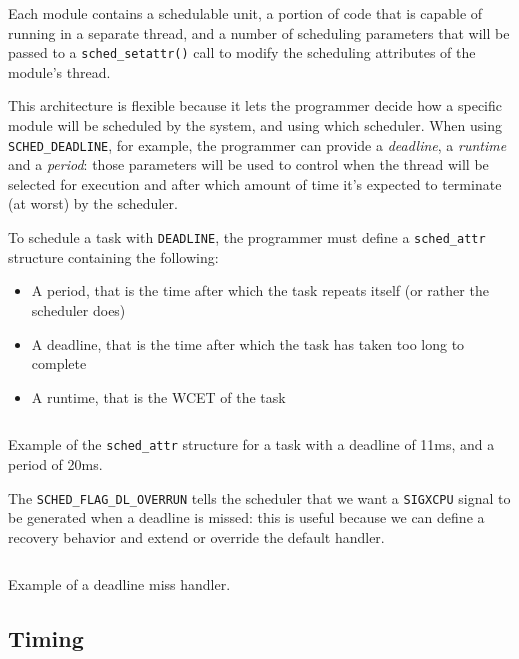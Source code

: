 \documentclass[a4paper,12pt]{report}
\begin{document}
Each module contains a schedulable unit, a portion of code that is capable of running in a separate thread, and a number of scheduling parameters that will be passed to a \texttt{sched\_setattr()} call to modify the scheduling attributes of the module's thread.

This architecture is flexible because it lets the programmer decide how a specific module will be scheduled by the system, and using which scheduler. When using \texttt{SCHED\_DEADLINE}, for example, the programmer can provide a \textit{deadline}, a \textit{runtime} and a \textit{period}: those parameters will be used to control when the thread will be selected for execution and after which amount of time it's expected to terminate (at worst) by the scheduler.

To schedule a task with \texttt{DEADLINE}, the programmer must define a \texttt{sched\_attr} structure containing the following:

\begin{itemize}
    \item A period, that is the time after which the task repeats itself (or rather the scheduler does)
    \item A deadline, that is the time after which the task has taken too long to complete
    \item A runtime, that is the WCET of the task
\end{itemize}


\begin{listing}[H]
\inputminted[frame=single,framesep=10pt]{c}{snippets/sched-attr.c}
\caption{Example of the \texttt{sched\_attr} structure for a task with a deadline of 11ms, and a period of 20ms.}
\end{listing}

The \texttt{SCHED\_FLAG\_DL\_OVERRUN} tells the scheduler that we want a \texttt{SIGXCPU} signal to be generated when a deadline is missed: this is useful because we can define a recovery behavior and extend or override the default handler.

\begin{listing}[H]
\inputminted[frame=single,framesep=10pt]{c}{snippets/dl-miss-handler.c}
\caption{Example of a deadline miss handler.}
\end{listing}


\subsection{Timing}
\end{document}
